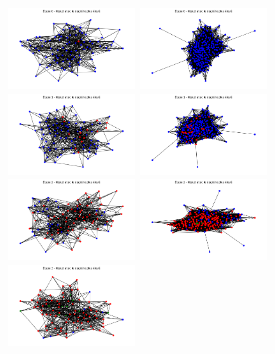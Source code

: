 \documentclass{article}
\begin{document}
\begin{figure}[!h]
    \centering
    \includegraphics[width=0.30\textwidth]{assets/epidemiologie/2013_high_0.png}
    \hfill
    \includegraphics[width=0.30\textwidth]{assets/epidemiologie/2015_high_0.png} \\
    \includegraphics[width=0.30\textwidth]{assets/epidemiologie/2013_high_1.png}
    \hfill
    \includegraphics[width=0.30\textwidth]{assets/epidemiologie/2015_high_1.png} \\
    \includegraphics[width=0.30\textwidth]{assets/epidemiologie/2013_high_2.png}
    \hfill
    \includegraphics[width=0.30\textwidth]{assets/epidemiologie/2015_high_2.png} \\
    \includegraphics[width=0.30\textwidth]{assets/epidemiologie/2013_high_3.png}

\end{figure}
\end{document}
